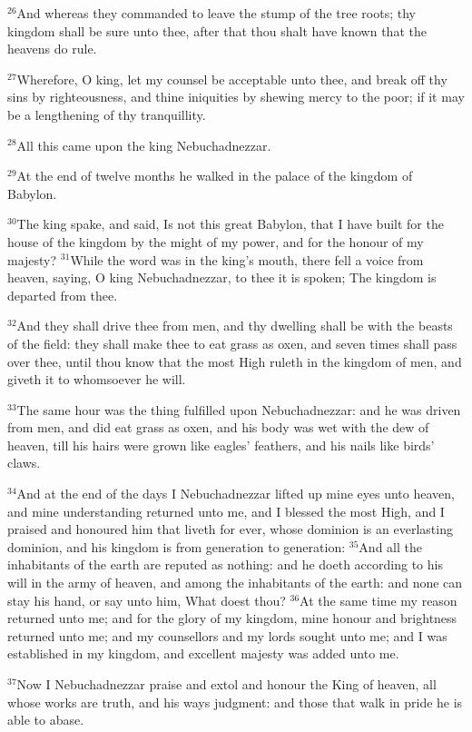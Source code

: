\documentclass[12pt]{article}
\begin{document}
$^{26}$And whereas they commanded to leave the stump of the tree roots;
thy kingdom shall be sure unto thee, after that thou shalt have known
that the heavens do rule.


$^{27}$Wherefore, O king, let my counsel be acceptable unto thee, and
break off thy sins by righteousness, and thine iniquities by shewing
mercy to the poor; if it may be a lengthening of thy tranquillity.


$^{28}$All this came upon the king Nebuchadnezzar.

$^{29}$At the end of twelve months he walked in the palace of the
kingdom of Babylon.


$^{30}$The king spake, and said, Is not this great Babylon, that I have
built for the house of the kingdom by the might of my power, and for
the honour of my majesty?  $^{31}$While the word was in the king's
mouth, there fell a voice from heaven, saying, O king Nebuchadnezzar,
to thee it is spoken; The kingdom is departed from thee.


$^{32}$And they shall drive thee from men, and thy dwelling shall be
with the beasts of the field: they shall make thee to eat grass as
oxen, and seven times shall pass over thee, until thou know that the
most High ruleth in the kingdom of men, and giveth it to whomsoever he
will.


$^{33}$The same hour was the thing fulfilled upon Nebuchadnezzar: and he
was driven from men, and did eat grass as oxen, and his body was wet
with the dew of heaven, till his hairs were grown like eagles'
feathers, and his nails like birds' claws.


$^{34}$And at the end of the days I Nebuchadnezzar lifted up mine eyes
unto heaven, and mine understanding returned unto me, and I blessed
the most High, and I praised and honoured him that liveth for ever,
whose dominion is an everlasting dominion, and his kingdom is from
generation to generation: $^{35}$And all the inhabitants of the earth
are reputed as nothing: and he doeth according to his will in the army
of heaven, and among the inhabitants of the earth: and none can stay
his hand, or say unto him, What doest thou?  $^{36}$At the same time my
reason returned unto me; and for the glory of my kingdom, mine honour
and brightness returned unto me; and my counsellors and my lords
sought unto me; and I was established in my kingdom, and excellent
majesty was added unto me.


$^{37}$Now I Nebuchadnezzar praise and extol and honour the King of
heaven, all whose works are truth, and his ways judgment: and those
that walk in pride he is able to abase.
\end{document}
